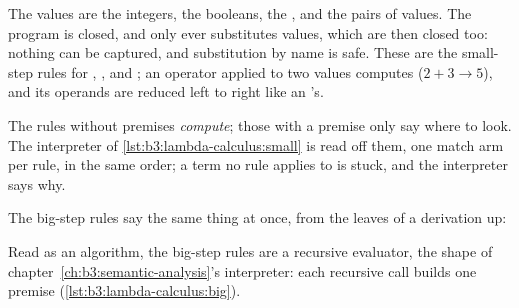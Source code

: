 The values are the integers, the booleans, the , and the pairs of values. The program is closed, and  only ever substitutes values, which are then closed too: nothing can be captured, and substitution by name is safe. These are the small-step rules for , ,  and ; an operator applied to two values computes ($2 + 3 \to 5$), and its operands are reduced left to right like an 's.
\begin{mathpar}






\end{mathpar}
The rules without premises \emph{compute}; those with a premise only say where to look. The interpreter of \cref{lst:b3:lambda-calculus:small} is read off them, one match arm per rule, in the same order; a term no rule applies to is stuck, and the interpreter says why.

\label{lst:b3:lambda-calculus:small}

The big-step rules say the same thing at once, from the leaves of a derivation up:
\begin{mathpar}




\end{mathpar}
Read as an algorithm, the big-step rules are a recursive evaluator, the shape of chapter~\ref{ch:b3:semantic-analysis}'s interpreter: each recursive call builds one premise (\cref{lst:b3:lambda-calculus:big}).

